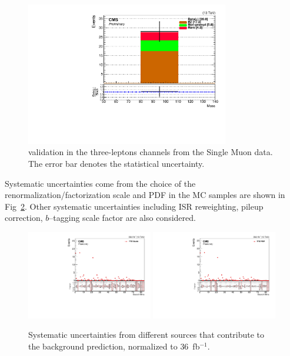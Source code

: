 \begin{figure}[htbp]
  \begin{center}
    \includegraphics[width=0.79\textwidth]{sections/mc4/Backgrounds/TTZRare/figures/RecoZMass_7.pdf}
  \end{center}
  \caption{\ttbarZ validation in the three-leptons channels from the
  Single Muon data. The error bar denotes the statistical uncertainty.}
  \label{fig:ttZSUSY}
\end{figure}


Systematic uncertainties come from the choice of the renormalization/factorization
scale and PDF in the \ttbarZ MC samples are shown in
Fig~\ref{fig:ttZSysUncern}.  Other systematic uncertainties including ISR
reweighting, pileup correction, $b$--tagging scale factor are also considered.


\begin{figure}[htbp]
  \begin{center}
    \includegraphics[width=0.49\textwidth]{sections/mc4/Backgrounds/TTZRare/figures/TTZ_Scale.pdf}
    \includegraphics[width=0.49\textwidth]{sections/mc4/Backgrounds/TTZRare/figures/TTZ_PDF.pdf}
  \end{center}
  \caption{Systematic uncertainties from different sources that contribute to 
  the \ttbarZ background prediction, normalized to $36$~fb$^{-1}$.}
  \label{fig:ttZSysUncern}
\end{figure}

